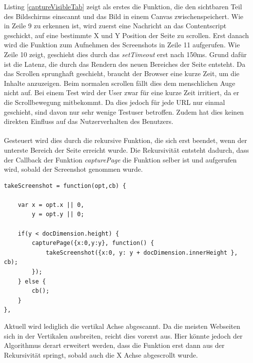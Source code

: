 Listing \ref{captureVisibleTab} zeigt als erstes die Funktion, die den sichtbaren Teil des Bildschirms einscannt und das Bild in einem Canvas zwischenspeichert. Wie in Zeile 9 zu erkennen ist, wird zuerst eine Nachricht an das Contentscript geschickt, auf eine bestimmte X und Y Position der Seite zu scrollen. Erst danach wird die Funktion zum Aufnehmen des Screenshots in Zeile 11 aufgerufen. Wie Zeile 10 zeigt, geschieht dies durch das \textit{setTimeout} erst nach 150ms. Grund dafür ist die Latenz, die durch das Rendern des neuen Bereiches der Seite entsteht. Da das Scrollen sprunghaft geschieht, braucht der Browser eine kurze Zeit, um die Inhalte anzuzeigen. Beim normalen scrollen fällt dies dem menschlichen Auge nicht auf. Bei einem Test wird der User zwar für eine kurze Zeit irritiert, da er die Scrollbewegung mitbekommt. Da dies jedoch für jede URL nur einmal geschieht, sind davon nur sehr wenige Testuser betroffen. Zudem hat dies keinen direkten Einfluss auf das Nutzerverhalten des Benutzers.\\
\\
Gesteuert wird dies durch die rekursive Funktion, die sich erst beendet, wenn der unterste Bereich der Seite erreicht wurde. Die Rekursivität entsteht dadurch, dass der Callback der Funktion \textit{capturePage} die Funktion selber ist und aufgerufen wird, sobald der Screenshot genommen wurde.
\\
\begin{lstlisting}[caption=Rekursive Funktion die das Abscannen der Seite steuert,label=takeScreenshot]
takeScreenshot = function(opt,cb) {

    var x = opt.x || 0,
        y = opt.y || 0;

    if(y < docDimension.height) {
        capturePage({x:0,y:y}, function() {
            takeScreenshot({x:0, y: y + docDimension.innerHeight }, cb);
        });
    } else {
        cb();
    }
},
\end{lstlisting}
\vspace{0,5cm}

Aktuell wird lediglich die vertikal Achse abgescannt. Da die meisten Webseiten sich in der Vertikalen ausbreiten, reicht dies vorerst aus. Hier könnte jedoch der Algorithmus derart erweitert werden, dass die Funktion erst dann aus der Rekursivität springt, sobald auch die X Achse abgescrollt wurde.
